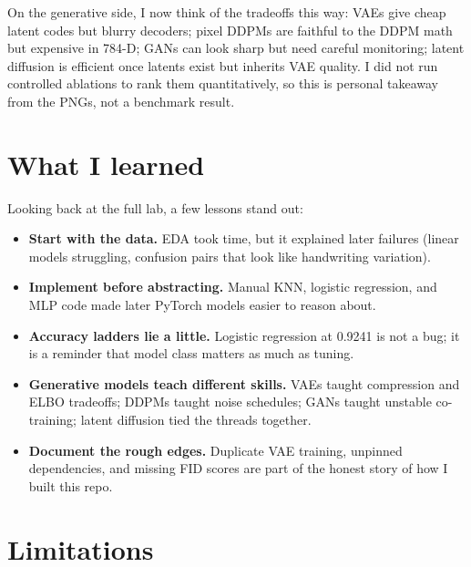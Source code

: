 \documentclass[11pt,a4paper]{article}
\begin{document}
On the generative side, I now think of the tradeoffs this way: VAEs give cheap latent codes but blurry decoders; pixel DDPMs are faithful to the DDPM math but expensive in 784-D; GANs can look sharp but need careful monitoring; latent diffusion is efficient once latents exist but inherits VAE quality. I did not run controlled ablations to rank them quantitatively, so this is personal takeaway from the PNGs, not a benchmark result.

\section{What I learned}
\label{sec:learned}

Looking back at the full lab, a few lessons stand out:

\begin{itemize}[noitemsep]
  \item \textbf{Start with the data.} EDA took time, but it explained later failures (linear models struggling, confusion pairs that look like handwriting variation).
  \item \textbf{Implement before abstracting.} Manual KNN, logistic regression, and MLP code made later PyTorch models easier to reason about.
  \item \textbf{Accuracy ladders lie a little.} Logistic regression at 0.9241 is not a bug; it is a reminder that model class matters as much as tuning.
  \item \textbf{Generative models teach different skills.} VAEs taught compression and ELBO tradeoffs; DDPMs taught noise schedules; GANs taught unstable co-training; latent diffusion tied the threads together.
  \item \textbf{Document the rough edges.} Duplicate VAE training, unpinned dependencies, and missing FID scores are part of the honest story of how I built this repo.
\end{itemize}

\section{Limitations}
\label{sec:limits}
\end{document}
